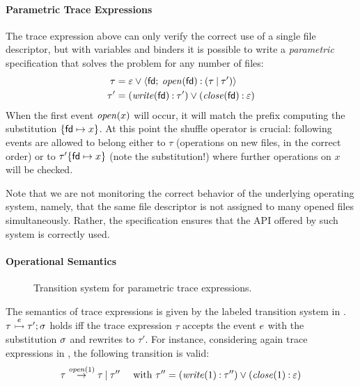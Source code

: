 
\paragraph{Parametric Trace Expressions}
The trace expression above can only verify the correct use of a single file descriptor, but with variables and binders \cite{AnconaFM17} it is possible to write a \emph{parametric} specification that solves the problem for any number of files:
\begin{align}
\label{eq:files1}
\tau &= \varepsilon \mathbin{\vee} {\langle}\mathsf{fd};\:{\mathit{open}(\mathsf{fd}) \mathbin{:} (\tau \mathbin{|} \tau')}{\rangle}\\
\label{eq:files2}
\tau' &= (\mathit{write}(\mathsf{fd}) \mathbin{:} \tau') \mathbin{\vee} (\mathit{close}(\mathsf{fd}) \mathbin{:} \varepsilon)
\end{align}
When the first event \(\mathit{open}(x)\) will occur, it will match the prefix computing the substitution \(\{\mathsf{fd}\mapsto x\}\).
At this point the shuffle operator is crucial:
following events are allowed to belong either to \(\tau\) (operations on new files, in the correct order) or to \(\tau'\{\mathsf{fd}\mapsto x\}\) (note the substitution!) where further operations on \(x\) will be checked.

Note that we are not monitoring the correct behavior of the underlying operating system, namely, that the same file descriptor is not assigned to many opened files simultaneously.
Rather, the specification ensures that the API offered by such system is correctly used.

\paragraph{Operational Semantics}
\begin{figure}[t]

\caption{Transition system for parametric trace expressions.}
\label{fig:semantics}
\end{figure}
The semantics of trace expressions is given by the labeled transition system in .
\( \tau \stackrel{{e}}{\rightarrowtail} \tau';\sigma \) holds iff the trace expression \(\tau\) accepts the event \(e\) with the substitution \(\sigma\) and rewrites to \(\tau'\).
For instance, considering again trace expressions in , the following transition is valid:
\[
  \tau \stackrel{{\mathit{open}(1)}}{\rightarrow} \tau\mathbin{|} \tau'' \quad \mbox{ with }
  \tau''= (\mathit{write}(1) \mathbin{:} \tau'') \mathbin{\vee} (\mathit{close}(1) \mathbin{:} \varepsilon)
\]


